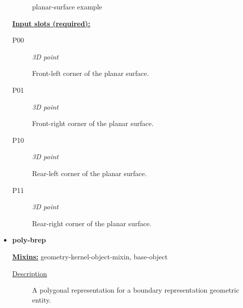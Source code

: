 \documentclass [11pt]{book}
\begin{document}
\begin{itemize}
\begin{figure}
\caption{planar-surface example}

\label{fig:planar-surface}

\end{figure}





\textbf{
\underline{Input slots (required):}}

\begin{description}

\item [P00]
\emph{3D point}

 Front-left  corner of the planar surface.




\item [P01]
\emph{3D point}

 Front-right corner of the planar surface.




\item [P10]
\emph{3D point}

 Rear-left  corner of the planar surface.




\item [P11]
\emph{3D point}

 Rear-right corner of the planar surface.




\end{description}







\item {}
\label{prim:poly-brep}
\textbf{poly-brep}


\textbf{
\underline{Mixins:}} geometry-kernel-object-mixin, base-object





\begin{description}

\item [
\underline{Description}]


A polygonal representation for a boundary representation geometric entity.



\end{description}









\end{itemize}
\end{document}
